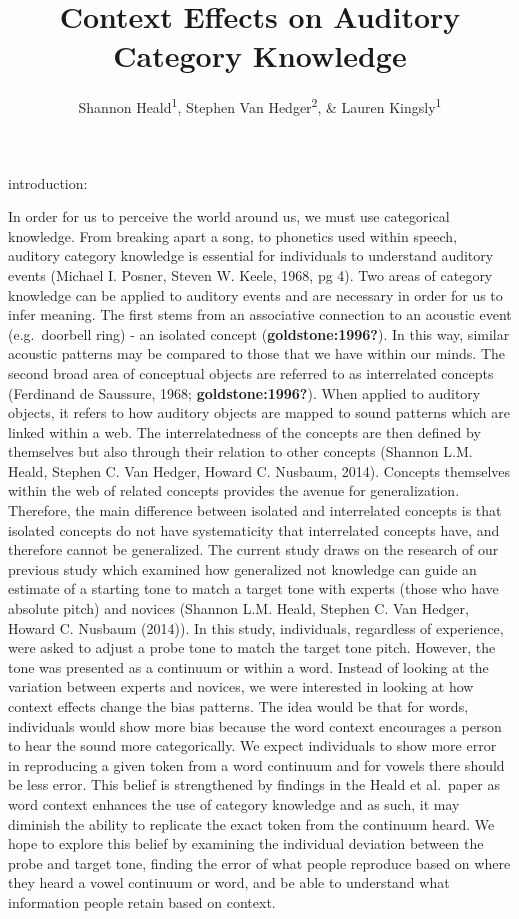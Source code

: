 \documentclass[
  man,floatsintext]{apa6}
\title{Context Effects on Auditory Category Knowledge}
\author{Shannon Heald\textsuperscript{1}, Stephen Van Hedger\textsuperscript{2}, \& Lauren Kingsly\textsuperscript{1}}
\date{}
\affiliation{\vspace{0.5cm}\textsuperscript{1} University of Chicago\\\textsuperscript{2} University of Western Ontario}
\begin{document}
\maketitle

introduction:

In order for us to perceive the world around us, we must use categorical knowledge. From breaking apart a song, to phonetics used within speech, auditory category knowledge is essential for individuals to understand auditory events (Michael I. Posner, Steven W. Keele, 1968, pg 4).
Two areas of category knowledge can be applied to auditory events and are necessary in order for us to infer meaning. The first stems from an associative connection to an acoustic event (e.g.~doorbell ring) - an isolated concept (\textbf{goldstone:1996?}). In this way, similar acoustic patterns may be compared to those that we have within our minds. The second broad area of conceptual objects are referred to as interrelated concepts (Ferdinand de Saussure, 1968; \textbf{goldstone:1996?}). When applied to auditory objects, it refers to how auditory objects are mapped to sound patterns which are linked within a web. The interrelatedness of the concepts are then defined by themselves but also through their relation to other concepts (Shannon L.M. Heald, Stephen C. Van Hedger, Howard C. Nusbaum, 2014). Concepts themselves within the web of related concepts provides the avenue for generalization. Therefore, the main difference between isolated and interrelated concepts is that isolated concepts do not have systematicity that interrelated concepts have, and therefore cannot be generalized. The current study draws on the research of our previous study which examined how generalized not knowledge can guide an estimate of a starting tone to match a target tone with experts (those who have absolute pitch) and novices (Shannon L.M. Heald, Stephen C. Van Hedger, Howard C. Nusbaum (2014)). In this study, individuals, regardless of experience, were asked to adjust a probe tone to match the target tone pitch. However, the tone was presented as a continuum or within a word. Instead of looking at the variation between experts and novices, we were interested in looking at how context effects change the bias patterns. The idea would be that for words, individuals would show more bias because the word context encourages a person to hear the sound more categorically. We expect individuals to show more error in reproducing a given token from a word continuum and for vowels there should be less error. This belief is strengthened by findings in the Heald et al.~paper as word context enhances the use of category knowledge and as such, it may diminish the ability to replicate the exact token from the continuum heard. We hope to explore this belief by examining the individual deviation between the probe and target tone, finding the error of what people reproduce based on where they heard a vowel continuum or word, and be able to understand what information people retain based on context.
\end{document}
